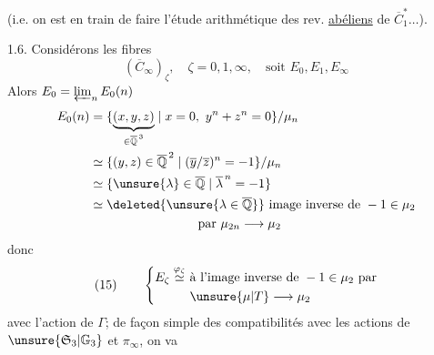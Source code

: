 (i.e. on est en train de faire l'étude arithmétique des rev.
 \uline{abéliens} de $\overline C_1^*\ldots$).

1.6. Considérons les fibres
\[
(\overline C_\infty)_\zeta,\quad\zeta=0,1,\infty,\quad\text{soit }E_0,E_1,E_\infty
\]
Alors $E_0=\varprojlim_n E_0(n)$
\[
\begin{aligned}
E_0(n)&=\{\underbrace{(x,y,z)}_{\in\overline{\mathbb Q}^{\,3}}\mid x=0,\ y^n+z^n=0\}/\mu_n\\
&\simeq\{(y,z)\in\overline{\mathbb Q}^{\,2}\mid(\overline y/\overline z)^n=-1\}/\mu_n\\
&\simeq\{\unsure{\lambda}\in\overline{\mathbb Q}\mid\overline\lambda^{\,n}=-1\}\\
&\simeq\deleted{\unsure{\lambda\in\overline{\mathbb Q}}}\ \text{image inverse de }-1\in\mu_2\\
&\hspace{3cm}\text{par }\mu_{2n}\longrightarrow\mu_2
\end{aligned}
\]
donc
\[
(15)\qquad\left\{\begin{aligned}
E_\zeta\overset{\varphi_\zeta}{\simeq}\ &\text{à l'image inverse de }-1\in\mu_2\text{ par}\\
&\unsure{\mu|T}\longrightarrow\mu_2
\end{aligned}\right.
\]
avec l'action de  $\Gamma$;
 de façon simple des compatibilités avec les actions de
$\unsure{\mathfrak S_3|\mathbb G_3}$ et $\pi_\infty$, on va 
